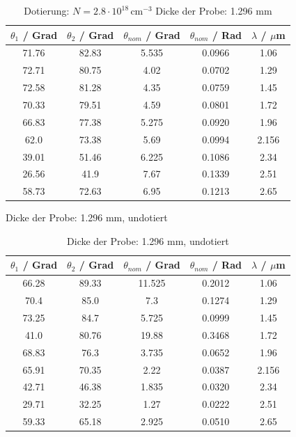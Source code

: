 \begin{table}[h] 
\centering 
\caption{Dotierung: \( N = 2.8\cdot10^{18} \, \text{cm}^{-3} \)
Dicke der Probe: 1.296 mm}
\begin{tabular}{|c|c|c|c|c|} 
\hline
$\theta_1$ / Grad & $\theta_2$ / Grad & $\theta_{nom}$ / Grad & $\theta_{nom}$ / Rad & $\lambda$ / $\mu$m \\
\hline 
71.76 & 82.83 & 5.535 & 0.0966 & 1.06 \\
72.71 & 80.75 & 4.02 & 0.0702 & 1.29 \\
72.58 & 81.28 & 4.35 & 0.0759 & 1.45 \\
70.33 & 79.51 & 4.59 & 0.0801 & 1.72 \\
66.83 & 77.38 & 5.275 & 0.0920 & 1.96 \\
62.0 & 73.38 & 5.69 & 0.0994 & 2.156 \\
39.01 & 51.46 & 6.225 & 0.1086 & 2.34 \\ 
26.56 & 41.9 & 7.67 & 0.1339 & 2.51 \\
58.73 & 72.63 & 6.95 & 0.1213 & 2.65 \\  
\hline 
\end{tabular} 
\label{tab:winkel_wellenlaenge2} 
\end{table}

Dicke der Probe: 1.296 mm, undotiert

\begin{table}[h] 
\centering 
\caption{Dicke der Probe: 1.296 mm, undotiert}
\begin{tabular}{|c|c|c|c|c|} 
\hline
$\theta_1$ / Grad & $\theta_2$ / Grad & $\theta_{nom}$ / Grad & $\theta_{nom}$ / Rad & $\lambda$ / $\mu$m \\ 
\hline 
66.28 & 89.33 & 11.525 & 0.2012 & 1.06 \\
70.4 & 85.0 & 7.3 & 0.1274 & 1.29 \\
73.25 & 84.7 & 5.725 & 0.0999 & 1.45 \\
41.0 & 80.76 & 19.88 & 0.3468 & 1.72 \\
68.83 & 76.3 & 3.735 & 0.0652 & 1.96 \\
65.91 & 70.35 & 2.22 & 0.0387 & 2.156 \\
42.71 & 46.38 & 1.835 & 0.0320 & 2.34 \\
29.71 & 32.25 & 1.27 & 0.0222 & 2.51 \\
59.33 & 65.18 & 2.925 & 0.0510 & 2.65 \\ 
\hline 
\end{tabular} 
\label{tab:winkel_wellenlaenge3} 
\end{table}
\FloatBarrier

